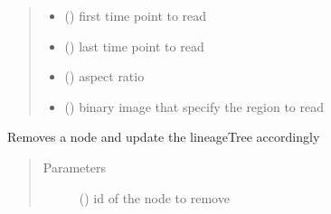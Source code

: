 \documentclass[letterpaper,10pt,english]{sphinxmanual}
\begin{document}
\begin{fulllineitems}
\begin{fulllineitems}
\begin{quote}
\begin{description}
\begin{itemize}
\item {} 
 () \textendash{} first time point to read

\item {} 
 () \textendash{} last time point to read

\item {} 
 () \textendash{} aspect ratio

\item {} 
 () \textendash{} binary image that specify the region to read

\end{itemize}

\end{description}\end{quote}

\end{fulllineitems}


\begin{fulllineitems}
\label{\detokenize{index:LineageTree.lineageTree.remove_node}}
Removes a node and update the lineageTree accordingly
\begin{quote}\begin{description}
\item[{Parameters}] \leavevmode
{} () \textendash{} id of the node to remove

\end{description}\end{quote}

\end{fulllineitems}



\end{fulllineitems}
\end{document}
